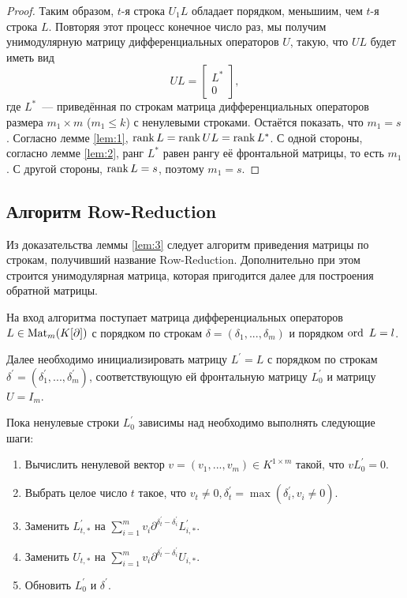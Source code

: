 \begin{proof}
            Таким образом, $t$-я строка $U_1L$ обладает порядком, меньшиим, чем $t$-я строка 
            $L$. Повторяя этот процесс конечное число раз, мы получим унимодулярную 
            матрицу дифференциальных операторов $U$, такую, что $UL$ будет иметь вид 
            $$UL=\left[
                    \begin{array}{cc}
                        L^{*} \\ \hline
                        0
                    \end{array}
                \right],$$
            где $L^{*}$~--- приведённая по строкам матрица дифференциальных операторов 
            размера $m_1 \times m$ ($m_1 \leq k$) с ненулевыми строками. Остаётся показать, что
            $m_1 = s$. Согласно лемме \ref{lem:1}, $\mathop{\mathrm{rank}}\nolimits L=\mathop{\mathrm{rank}}\nolimits UL
            =\mathop{\mathrm{rank}}\nolimits L^{*}$. С одной стороны, согласно лемме \ref{lem:2}, ранг $L^{*}$ 
            равен рангу её фронтальной матрицы, то есть $m_1$. С другой стороны, $\mathop{\mathrm{rank}}\nolimits L=s$, 
            поэтому $m_1=s$.
        \end{proof}
    \subsection{Алгоритм Row-Reduction}
        \label{r-r}
        Из доказательства леммы \ref{lem:3} следует алгоритм приведения матрицы по строкам, получивший название
        Row-Reduction.
        Дополнительно при этом строится унимодулярная матрица, которая пригодится
        далее для построения обратной матрицы.


        На вход алгоритма поступает матрица дифференциальных операторов $L\in \mathop{\mathrm{Mat}}\nolimits_m(K[\partial])$
        с порядком по строкам $\delta=(\delta_1,...,\delta_m)$ и порядком $\mathop{\mathrm{ord}}\nolimits~L=l$.


        Далее необходимо инициализировать матрицу $L^{'}=L$ с порядком по строкам
        $\delta^{'}=(\delta_1^{'},...,\delta_m^{'})$, соответствующую ей фронтальную матрицу
        $L_0^{'}$ и матрицу $U=I_m$.


        Пока ненулевые строки $L_0^{'}$ зависимы над необходимо выполнять
        следующие шаги:
        \begin{enumerate}
            \item Вычислить ненулевой вектор $v=(v_1,...,v_m) \in K^{1\times m}$ такой, что $vL_0^{'}=0$.
            \item Выбрать целое число $t$ такое, что $v_t \neq 0, \delta_t^{'}=\max(\delta_i^{'},v_i\neq 0)$.
            \item Заменить $L_{t,*}^{'}$ на $\sum\limits_{i=1}^m v_i\partial^{\delta_t^{'}-\delta_i^{'}}L_{i,*}^{'}$.
            \item Заменить $U_{t,*}$ на $\sum\limits_{i=1}^m v_i\partial^{\delta_t^{'}-\delta_i^{'}}U_{i,*}$.
            \item Обновить $L_0^{'}$ и $\delta^{'}$.
        \end{enumerate}


